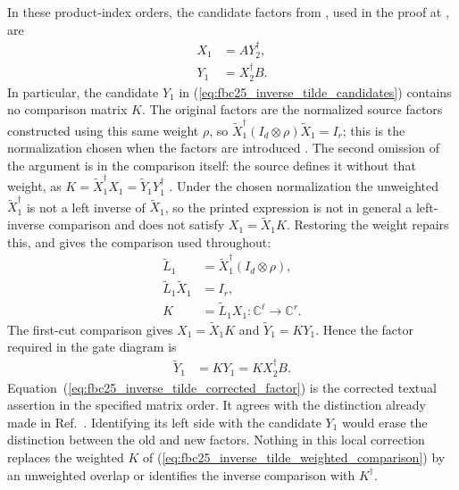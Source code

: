 \documentclass{article}
\begin{document}
In these product-index orders, the candidate factors from
, used in the proof at
\cite[line~5432]{FrancoRubio2025MPUGauging}, are
\begin{align}
    X_1 & =AY_2^\dagger,  \\
    Y_1 & =X_2^\dagger B.
    \label{eq:fbc25_inverse_tilde_candidates}
\end{align}
In particular, the candidate $Y_1$ in
(\ref{eq:fbc25_inverse_tilde_candidates}) contains no comparison matrix $K$.
The original factors are the normalized source factors constructed using this same weight $\rho$, so $\widetilde X_1^\dagger(I_d\otimes\rho)\widetilde X_1=I_r$; this is the normalization chosen when the factors are introduced
\cite[lines~487--494]{Cirac2017MPU}. The second omission of the argument is in the comparison itself: the source defines it without that weight, as
$K=\widetilde X_1^\dagger X_1=\widetilde Y_1Y_1^\dagger$
\cite[lines~5436--5439]{FrancoRubio2025MPUGauging}. Under the chosen normalization the unweighted $\widetilde X_1^\dagger$ is not a left inverse of $\widetilde X_1$, so the printed expression is not in general a left-inverse comparison and does not satisfy $X_1=\widetilde X_1K$. Restoring the weight repairs this, and gives the comparison used throughout:
\begin{align}
    \widetilde L_1               & =\widetilde X_1^\dagger(I_d\otimes\rho),                          \\
    \widetilde L_1\widetilde X_1 & =I_r,                                                             \\
    K                            & =\widetilde L_1X_1\colon\mathbb C^\ell\longrightarrow\mathbb C^r.
    \label{eq:fbc25_inverse_tilde_weighted_comparison}
\end{align}
The first-cut comparison gives $X_1=\widetilde X_1K$ and $\widetilde Y_1=KY_1$. Hence the factor required in the gate diagram is
\begin{align}
    \widetilde Y_1 & =KY_1=KX_2^\dagger B.
    \label{eq:fbc25_inverse_tilde_corrected_factor}
\end{align}
Equation~(\ref{eq:fbc25_inverse_tilde_corrected_factor}) is the corrected textual assertion in the specified matrix order. It agrees with the distinction already made in
Ref.~\cite[lines~5432--5435]{FrancoRubio2025MPUGauging}.
Identifying its left side with the candidate $Y_1$ would erase the distinction between the old and new factors. Nothing in this local correction replaces the weighted $K$ of
(\ref{eq:fbc25_inverse_tilde_weighted_comparison}) by an unweighted overlap or identifies the inverse comparison with $K^\dagger$.
\end{document}
